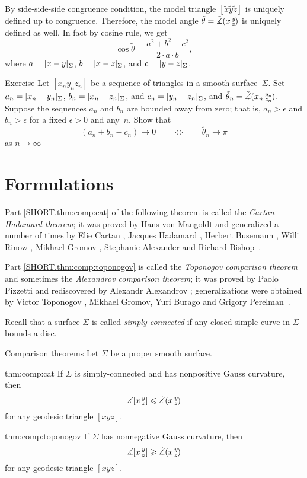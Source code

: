 By side-side-side congruence condition,
the model triangle $[\tilde x\tilde y\tilde z]$ is uniquely defined up to congruence.
Therefore, the model angle $\tilde\theta=\tilde\measuredangle(x\,{}^{y}_{z}\hspace{-0.2ex})$ is uniquely defined as well.
In fact by cosine rule, we get 
\[\cos \tilde\theta=\frac{a^2+b^2-c^2}{2\cdot a \cdot b},\]
where $a=\dist{x}{y}{\Sigma}$, $b=\dist{x}{z}{\Sigma}$, and $c=\dist{y}{z}{\Sigma}$.

\begin{thm}{Exercise}\label{ex:wide-hinges}
Let $[x_ny_nz_n]$ be a sequence of triangles in a smooth surface~$\Sigma$.
Set $a_n=\dist{x_n}{y_n}{\Sigma}$,
$b_n=\dist{x_n}{z_n}{\Sigma}$,
and $c_n=\dist{y_n}{z_n}{\Sigma}$, and $\tilde\theta_n=\tilde\measuredangle(x_n\,{}^{y_n}_{z_n}\hspace{-0.2ex})$.
Suppose the sequences $a_n$ and $b_n$ are bounded away from zero;
that is, $a_n>\epsilon$ and $b_n>\epsilon$ for a fixed $\epsilon>0$ and any~$n$.
Show that
\[(a_n+b_n-c_n)\to 0\qquad\iff\qquad \tilde\theta_n\to \pi\]
as $n\to\infty$
\end{thm}

\section{Formulations}

Part \ref{SHORT.thm:comp:cat} of the following theorem is called the {}\emph{Cartan--Hadamard theorem};
it was proved by 
Hans von Mangoldt \cite{mangoldt} and generalized a number of times by 
Elie Cartan \cite{cartan},
Jacques Hadamard \cite{hadamard},
Herbert Busemann \cite{busemann},
Willi Rinow \cite{rinow},
Mikhael Gromov \cite[p.~119]{gromov-1987},
Stephanie Alexander and Richard Bishop~\cite{alexander-bishop1990}.

Part \ref{SHORT.thm:comp:toponogov} is called the {}\emph{Toponogov comparison theorem} and sometimes the {}\emph{Alexandrov comparison theorem};
it was proved by Paolo Pizzetti \cite{pizzetti} and rediscovered by Alexandr Alexandrov \cite{aleksandrov}; 
generalizations were obtained by Victor Toponogov \cite{toponogov1957}, Mikhael Gromov, Yuri Burago and Grigory Perelman~\cite{burago-gromov-perelman}.

Recall that a surface $\Sigma$ is called {}\emph{simply-connected} if any closed simple curve in $\Sigma$ bounds a disc.

\begin{thm}{Comparison theorems}
\label{thm:comp}
Let $\Sigma$ be a proper smooth surface.

\begin{subthm}{thm:comp:cat}
If $\Sigma$ is simply-connected and has nonpositive Gauss curvature, then 
\[\measuredangle[x\,{}^{y}_{z}]\leqslant\tilde\measuredangle(x\,{}^{y}_{z}\hspace{-0.2ex})\]
for any geodesic triangle $[xyz]$.
\end{subthm}

\begin{subthm}{thm:comp:toponogov}
If $\Sigma$ has nonnegative Gauss curvature, then 
 \[\measuredangle[x\,{}^{y}_{z}]\geqslant\tilde\measuredangle(x\,{}^{y}_{z}\hspace{-0.2ex})\]
for any geodesic triangle $[xyz]$.
\end{subthm}

\end{thm}

